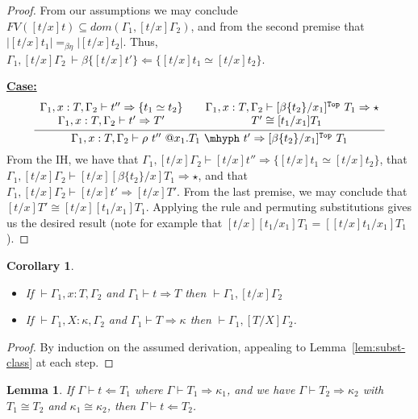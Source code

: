 \documentclass{article}
\newcommand{\tpcheck}[0]{\Leftarrow}
\newcommand{\tpsynth}[0]{\Rightarrow}
\newcommand{\startcase}[1]{\vspace{#1} \noindent\textbf{\underline{Case:}}}
\newtheorem{lemma}[theorem]{Lemma}
\newtheorem{corollary}[theorem]{Corollary}
\begin{document}
\begin{proof}
  From our assumptions we may conclude \(\textit{FV}([t/x]t) \subseteq
  \textit{dom}(\Gamma_1,[t/x]\Gamma_2)\), and from the second premise that
  \(|[t/x]t_1| =_{\beta\eta} |[t/x]t_2|\).
  Thus, \(\Gamma_1,[t/x]\Gamma_2\ \vdash \beta\{[t/x]t'\}\tpcheck \{[t/x]t_1
  \simeq [t/x]t_2\}\).

  \startcase{.2cm}
  \[
    \infer{\Gamma_1,x:T,\Gamma_2 \vdash \rho\ t''\ @x_1.T_1\ \mhyph\ t' \tpsynth [\beta\{t_2\}/x_1]^{\texttt{Top}}\ T_1}
    {
      \begin{array}{cc}
        \Gamma_1,x:T,\Gamma_2 \vdash t'' \tpsynth \{t_1 \simeq t_2\}
        & \quad \Gamma_1,x:T,\Gamma_2 \vdash [\beta\{t_2\}/x_1]^{\texttt{Top}}\ T_1 \tpsynth \star
        \\ \Gamma_1,x:T,\Gamma_2 \vdash t' \tpsynth T'
        & T' \cong [t_1/x_1]T_1
      \end{array}
    }
  \]
  From the IH, we have that \(\Gamma_1,[t/x]\Gamma_2 \vdash [t/x]t'' \tpsynth \{[t/x]t_1
  \simeq [t/x]t_2\}\), that \(\Gamma_1,[t/x]\Gamma_2 \vdash [t/x][\beta\{t_2\}/x]T_1
  \tpsynth \star\), and that \(\Gamma_1,[t/x]\Gamma_2 \vdash [t/x]t' \tpsynth
  [t/x]T'\).
  From the last premise, we may conclude that \([t/x]T' \cong
  [t/x][t_1/x_1]T_1\).
  Applying the rule and permuting substitutions gives us the desired result
  (note for example that \([t/x][t_1/x_1]T_1 = [[t/x]t_1/x_1]T_1\)).
\end{proof}

\begin{corollary}
  \ \\
  \begin{itemize}
  \item If \(\vdash \Gamma_1,x:T,\Gamma_2\) and \(\Gamma_1 \vdash t \tpsynth T\)
    then \(\vdash \Gamma_1,[t/x]\Gamma_2\)
    
  \item If \(\vdash \Gamma_1,X:\kappa,\Gamma_2\) and \(\Gamma_1 \vdash T
    \tpsynth \kappa\) then \(\vdash \Gamma_1,[T/X]\Gamma_2\).
  \end{itemize}
\end{corollary}
\begin{proof}
  By induction on the assumed derivation, appealing to
  Lemma~\ref{lem:subst-class} at each step.
\end{proof}

\begin{lemma}
  \label{lem:tpcheck-conv}
  If \(\Gamma \vdash t \tpcheck T_1\) where \(\Gamma \vdash T_1 \tpsynth
  \kappa_1\), and we have \(\Gamma \vdash T_2 \tpsynth \kappa_2\) with \(T_1
  \cong T_2\) and \(\kappa_1 \cong \kappa_2\), then \(\Gamma \vdash t \tpcheck T_2\).
\end{lemma}
\end{document}
